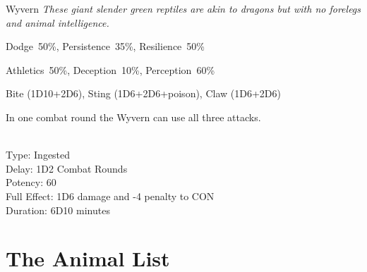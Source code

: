 \newpage

\begin{monsterbox}{Wyvern}
	\textit{These giant slender green reptiles are akin to dragons but with no forelegs and animal intelligence.}\\
	\rpghline
	\basics[%
        hitpoints  = 23, 
	majorwound = 12,
	damagemodifier = +2D6,
	powerpoints = 10,
	movementrate = {23m, 30m when flying},
	armor = Scales (5AP),
	plunderrating = 1
	]
	\rpghline%
	\stats[ %
		STR = 4D6+12 (26),
		CON = 2D6+12 (19),
		DEX = 2D6+6  (13),
		SIZ = 4D6+12 (26),
		INT = 7      (7),
		POW = 3D6    (11),
		CHA = 6      (6)
	]
	\rpghline%
	\begin{rpg-monsteraction}[Resistances]
		Dodge~50\%, Persistence~35\%, Resilience~50\%
	\end{rpg-monsteraction}
	\begin{rpg-monsteraction}[Practical]
		Athletics~50\%, Deception~10\%, Perception~60\%
	\end{rpg-monsteraction}
	\begin{rpg-monsteraction}
		Bite (1D10+2D6), Sting (1D6+2D6+poison), Claw (1D6+2D6)
	\end{rpg-monsteraction}
	\begin{rpg-monsteraction}
		In one combat round the Wyvern can use all three attacks.	
	\end{rpg-monsteraction}
	\begin{rpg-monsteraction}
		\\Type: Ingested\\
		Delay: 1D2 Combat Rounds\\
                Potency: 60\\
		Full Effect: 1D6 damage and -4 penalty to CON\\
		Duration: 6D10 minutes
	\end{rpg-monsteraction}

\end{monsterbox}

\clearpage

\section{The Animal List}

